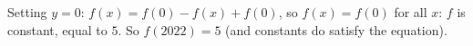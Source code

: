 Setting $y=0$: $f(x)=f(0)-f(x)+f(0)$, so $f(x)=f(0)$ for all $x$: $f$ is constant, equal to $5$. So $f(2022)=\boxed{5}$ (and constants do satisfy the equation).

